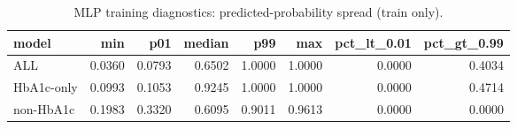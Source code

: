 \begin{table}[H]
\begin{center}
\begin{tabular}{lrrrrrrr}
\toprule
model & min & p01 & median & p99 & max & pct_lt_0.01 & pct_gt_0.99 \\
\midrule
ALL & 0.0360 & 0.0793 & 0.6502 & 1.0000 & 1.0000 & 0.0000 & 0.4034 \\
HbA1c-only & 0.0993 & 0.1053 & 0.9245 & 1.0000 & 1.0000 & 0.0000 & 0.4714 \\
non-HbA1c & 0.1983 & 0.3320 & 0.6095 & 0.9011 & 0.9613 & 0.0000 & 0.0000 \\
\bottomrule
\end{tabular}
\end{center}
\vspace{-5pt}
\caption{MLP training diagnostics: predicted-probability spread (train only).}
\label{tab:mlp_train_diagnostics}
\end{table}
